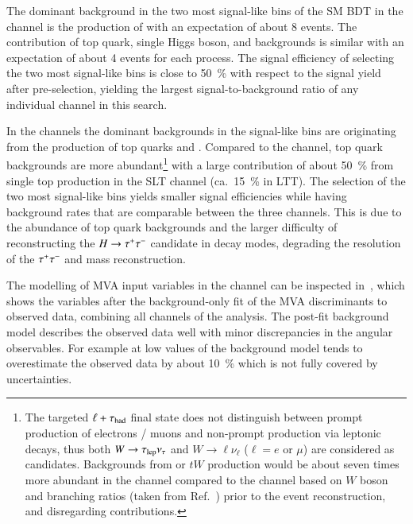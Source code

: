 The dominant background in the two most signal-like bins of the SM \HH BDT in
the \hadhad channel is the production of \ZHF with an expectation of about 8
events. The contribution of top quark, single Higgs boson, and \faketauhadvis
backgrounds is similar with an expectation of about 4 events for each
process. The signal efficiency of selecting the two most signal-like bins is
close to \SI{50}{\percent} with respect to the signal yield after pre-selection,
yielding the largest signal-to-background ratio of any individual channel in
this search.

In the \lephad channels the dominant backgrounds in the signal-like bins are
originating from the production of top quarks and \ZHF. Compared to the \hadhad
channel, top quark backgrounds are more abundant\footnote{The targeted
  $\ell + \tau_{\text{had}}$ final state does not distinguish between prompt production of
  electrons / muons and non-prompt production via leptonic \taulepton decays,
  thus both $W \to \tau_{\text{lep}} \nu_{\tau}$ and $W \to \ell \nu_{\ell}$ ($\ell = e$
  or $\mu$) are considered as \taulepvis candidates. Backgrounds from \ttbar or
  $tW$ production would be about seven times more abundant in the \lephad
  channel compared to the \hadhad channel based on $W$ boson and \taulepton
  branching ratios (taken from Ref.~\cite{pdg2020}) prior to the event
  reconstruction, and disregarding \faketauhadvis contributions.}  with a large
contribution of about \SI{50}{\percent} from single top production in the SLT
channel (ca.\ \SI{15}{\percent} in LTT). The selection of the two most
signal-like bins yields smaller signal efficiencies while having background
rates that are comparable between the three channels. This is due to the
abundance of top quark backgrounds and the larger difficulty of reconstructing
the $H \to \tau^{+} \tau^{-}$ candidate in \lephad decay modes, degrading the resolution
of the $\tau^{+} \tau^{-}$ and \HH mass reconstruction.

The modelling of MVA input variables in the \hadhad channel can be inspected
in~, which shows the variables after the
background-only fit of the MVA discriminants to observed data, combining all
channels of the analysis. The post-fit background model describes the observed
data well with minor discrepancies in the angular observables. For example at
low values of \dRtautau the background model tends to overestimate the observed
data by about \SI{10}{\percent} which is not fully covered by uncertainties.

